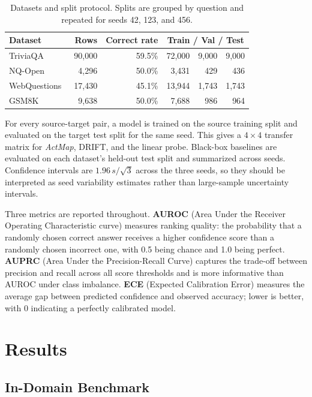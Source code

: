 \documentclass{article}
\newcommand{\actmap}{\textit{ActMap}}
\begin{document}
\begin{table}[H]
\centering
\caption{Datasets and split protocol. Splits are grouped by question and repeated for seeds 42, 123, and 456.}
\small
\setlength{\tabcolsep}{4pt}
\begin{tabular}{lrrr@{\,/\,}r@{\,/\,}r}
\toprule
Dataset & Rows & Correct rate & \multicolumn{3}{c}{Train / Val / Test} \\
\midrule
TriviaQA~\cite{triviaqa} & 90,000 & 59.5\% & 72,000 & 9,000 & 9,000 \\
NQ-Open~\cite{naturalquestions} & 4,296 & 50.0\% & 3,431 & 429 & 436 \\
WebQuestions~\cite{webquestions} & 17,430 & 45.1\% & 13,944 & 1,743 & 1,743 \\
GSM8K~\cite{gsm8k} & 9,638 & 50.0\% & 7,688 & 986 & 964 \\
\bottomrule
\end{tabular}
\label{tab:data}
\end{table}



For every source-target pair, a model is trained on the source training split and evaluated on the target test split for the same seed. This gives a \(4 \times 4\) transfer matrix for \actmap{}, DRIFT, and the linear probe. Black-box baselines are evaluated on each dataset's held-out test split and summarized across seeds. Confidence intervals are \(1.96\,s/\sqrt{3}\) across the three seeds, so they should be interpreted as seed variability estimates rather than large-sample uncertainty intervals.

Three metrics are reported throughout. \textbf{AUROC} (Area Under the Receiver Operating Characteristic curve) measures ranking quality: the probability that a randomly chosen correct answer receives a higher confidence score than a randomly chosen incorrect one, with 0.5 being chance and 1.0 being perfect. \textbf{AUPRC} (Area Under the Precision-Recall Curve) captures the trade-off between precision and recall across all score thresholds and is more informative than AUROC under class imbalance. \textbf{ECE} (Expected Calibration Error) measures the average gap between predicted confidence and observed accuracy; lower is better, with 0 indicating a perfectly calibrated model.

\section{Results}

\subsection{In-Domain Benchmark}
\end{document}
